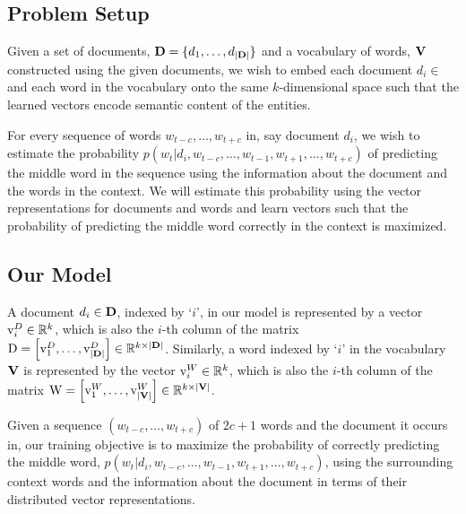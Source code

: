 \subsection{Problem Setup}
Given a set of documents, $\mathbf{D}=\{d_{1}, \ldots, d_{|\mathbf{D}|}\}$ and a vocabulary of words, $\mathbf{V}$ constructed using the given documents, we wish to embed each document $d_{i} \in$ \setD and each word in the vocabulary onto the same $k$-dimensional space such that the learned vectors encode semantic content of the entities. 

For every sequence of words $w_{t-c}, \ldots, w_{t+c}$ in, say document $d_{i}$, we wish to estimate the probability $p(w_{t}|d_{i}, w_{t-c}, \ldots, w_{t-1}, w_{t+1}, \ldots, w_{t+c})$ of predicting the middle word in the sequence using the information about the document and the words in the context. 
We will estimate this probability using the vector representations for documents and words and learn vectors such that the probability of predicting the middle word correctly in the context is maximized.

\subsection{Our Model}
\label{sec:docem_ourmodel}
A document $d_{i} \in \mathbf{D}$, indexed by `$i$', in our model is represented by a vector $\mathrm{v}^{D}_{i} \in \mathbb{R}^{k}$, which is also the $i$-th column of the matrix $\mathrm{D} = \left[\mathrm{v}^{D}_{1}, \ldots, \mathrm{v}^{D}_{|\mathbf{D}|}\right] \in \mathbb{R}^{k \times |\mathbf{D}|}$. 
Similarly, a word indexed by `$i$' in the vocabulary $\mathbf{V}$ is represented by the vector $\mathrm{v}^{W}_{i} \in \mathbb{R}^{k}$, which is also the $i$-th column of the matrix $\mathrm{W} = \left[\mathrm{v}^{W}_{1}, \ldots, \mathrm{v}^{W}_{|\mathbf{V}|}\right] \in \mathbb{R}^{k \times |\mathbf{V}|}$.

Given a sequence $(w_{t-c}, \ldots, w_{t+c})$ of $2c+1$ words and the document it occurs in, our training objective is to maximize the probability of correctly predicting the middle word, $p(w_{t} | d_{i}, w_{t-c}, \ldots, w_{t-1}, w_{t+1}, \ldots, w_{t+c})$, using the surrounding context words and the information about the document in terms of their distributed vector representations. 

